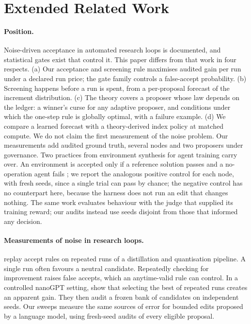 \section{Extended Related Work}
\label{app:related}

\paragraph{Position.}
Noise-driven acceptance in automated research loops is documented, and statistical gates exist that control it. This paper differs from that work in four respects. (a) Our acceptance and screening rule maximises audited gain per run under a declared run price; the gate family controls a false-accept probability. (b) Screening happens before a run is spent, from a per-proposal forecast of the increment distribution. (c) The theory covers a proposer whose law depends on the ledger: a winner's curse for any adaptive proposer, and conditions under which the one-step rule is globally optimal, with a failure example. (d) We compare a learned forecast with a theory-derived index policy at matched compute. We do not claim the first measurement of the noise problem. Our measurements add audited ground truth, several nodes and two proposers under governance. Two practices from environment synthesis for agent training carry over. An environment is accepted only if a reference solution passes and a no-operation agent fails \citep{xu2026skill2env}; we report the analogous positive control for each node, with fresh seeds, since a single trial can pass by chance; the negative control has no counterpart here, because the harness does not run an edit that changes nothing. The same work evaluates behaviour with the judge that supplied its training reward; our audits instead use seeds disjoint from those that informed any decision.

\paragraph{Measurements of noise in research loops.}
\citet{jalaian2026noise} replay accept rules on repeated runs of a distillation and quantisation pipeline. A single run often favours a neutral candidate. Repeatedly checking for improvement raises false accepts, which an anytime-valid rule can control. In a controlled nanoGPT setting, \citet{grover2026lucky} show that selecting the best of repeated runs creates an apparent gain. They then audit a frozen bank of candidates on independent seeds. Our sweeps measure the same sources of error for bounded edits proposed by a language model, using fresh-seed audits of every eligible proposal.

